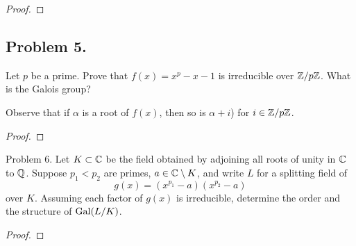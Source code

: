 \documentclass{article}
\begin{document}
\begin{proof}
\end{proof}
\pagebreak

\subsection{Problem 5.}
  Let $p$ be a prime. Prove that $f(x) = x^p - x - 1$ is irreducible over
  $\mathbb Z/p\mathbb Z$. What is the Galois group?

\begin{hint}
  Observe that if $\alpha$ is a root of $f(x)$, then so is $\alpha + i$) for $i \in \mathbb Z/p\mathbb Z$.
\end{hint}
\begin{proof}
\end{proof}
\pagebreak

\begin{subsection}{Problem 6.}
  Let $K \subset \mathbb C$ be the field obtained by adjoining all roots of unity in
  $\mathbb C$ to $\mathbb Q$. Suppose $p_1 < p_2$ are primes, $a \in \mathbb C \setminus K$, and
  write $L$ for a splitting field of \[
    g(x) = (x^{p_1} - a)(x^{p_2} - a)
  \] over $K$. Assuming each factor of $g(x)$ is irreducible, determine the
  order and the structure of $\operatorname{Gal}(L/K)$.
\end{subsection}

\begin{proof}
\end{proof}
\end{document}
